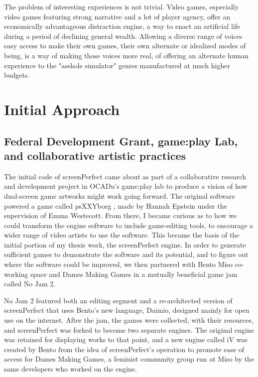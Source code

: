 The problem of interesting experiences is not trivial. Video games, especially video games featuring strong narrative and a lot of player agency, offer an economically advantageous distraction engine, a way to enact an artificial life during a period of declining general wealth. Allowing a diverse range of voices easy access to make their own games, their own alternate or idealized modes of being, is a way of making those voices more real, of offering an alternate human experience to the "asshole simulator" \parencite{bissell} genres manufactured at much higher budgets.
 
\section{Initial Approach}
\subsection{Federal Development Grant, game:play Lab, and collaborative artistic practices}
The initial code of screenPerfect came about as part of a collaborative research and development project in OCADu's game:play lab to produce a vision of how dual-screen game artworks might work going forward. The original software powered a game called psXXYborg \parencite{psxxyborg}, made by Hannah Epstein under the supervision of Emma Westecott. From there, I became curious as to how we could transform the engine software to include game-editing tools, to encourage a wider range of video artists to use the software. This became the basis of the initial portion of my thesis work, the screenPerfect engine. In order to generate sufficient games to demonstrate the software and its potential, and to figure out where the software could be improved, we then partnered with Bento Miso co-working space and Dames Making Games in a mutually beneficial game jam called No Jam 2.

No Jam 2 featured both an editing segment and a re-architected version of screenPerfect that uses Bento's new language, Daimio, designed mainly for open use on the internet. After the jam, the games were collected, with their resources, and screenPerfect was forked to become two separate engines. The original engine was retained for displaying works to that point, and a new engine called iV was created by Bento from the idea of screenPerfect's operation to promote ease of access for Dames Making Games, a feminist community group run at Miso by the same developers who worked on the engine. 

